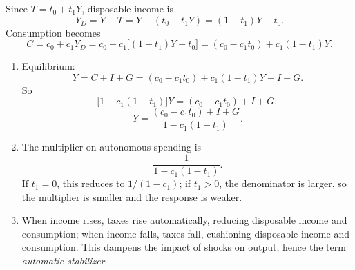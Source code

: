 \documentclass[12pt]{article}
\begin{document}
Since \(T=t_0+t_1Y\), disposable income is
\[
Y_D = Y - T = Y - (t_0+t_1Y) = (1-t_1)Y - t_0.
\]
Consumption becomes
\[
C = c_0 + c_1Y_D
  = c_0 + c_1\bigl[(1-t_1)Y - t_0\bigr]
  = (c_0 - c_1t_0) + c_1(1-t_1)Y.
\]

\begin{enumerate}[label=(\alph*)]
\item Equilibrium:
\[
Y = C + I + G
  = (c_0 - c_1t_0) + c_1(1-t_1)Y + I + G.
\]
So
\[
\bigl[1-c_1(1-t_1)\bigr]Y = (c_0 - c_1t_0) + I + G,
\]
\[
Y=\frac{(c_0 - c_1t_0) + I + G}{1-c_1(1-t_1)}.
\]

\item The multiplier on autonomous spending is
\[
\frac{1}{1-c_1(1-t_1)}.
\]
If \(t_1=0\), this reduces to \(1/(1-c_1)\); if \(t_1>0\), the denominator is larger, so the multiplier is smaller and the response is weaker.

\item When income rises, taxes rise automatically, reducing disposable income and consumption; when income falls, taxes fall, cushioning disposable income and consumption. This dampens the impact of shocks on output, hence the term \emph{automatic stabilizer}.
\end{enumerate}
\end{document}
